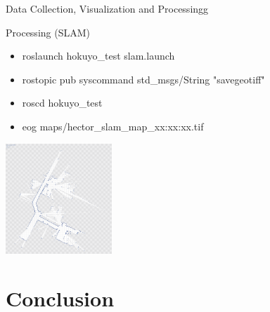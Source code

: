 \documentclass[10pt]{beamer}
\begin{document}
\begin{frame}[allowframebreaks]{Data Collection, Visualization and Processingg}
  \begin{block}{Processing (SLAM)}
   \begin{itemize}
    \item roslaunch hokuyo\_test slam.launch
    \item rostopic pub syscommand std\_msgs/String "savegeotiff"
    \item roscd hokuyo\_test
    \item eog maps/hector\_slam\_map\_xx:xx:xx.tif
   \end{itemize}
   \begin{center}
    \includegraphics[width=0.3\textwidth]{newmap.png}
   \end{center}
  \end{block}  
 \end{frame}
 
 \section{Conclusion}
 
\end{document}
